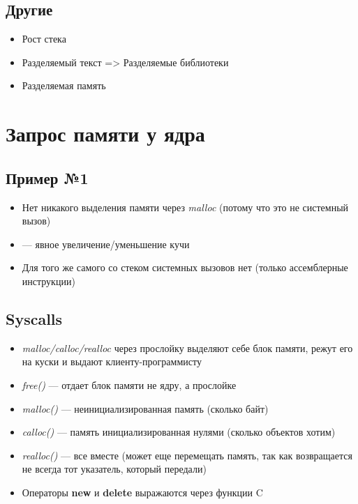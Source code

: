 \documentclass[../../lectures.tex]{subfiles}
\begin{document}
\subsection{Другие}
\begin{itemize}
    \item Рост стека
    \item Разделяемый текст => Разделяемые библиотеки
    \item Разделяемая память
\end{itemize}

\section{Запрос памяти у ядра}
\subsection{Пример №1}


\begin{itemize}
    \item Нет никакого выделения памяти через \emph{malloc} (потому что это не системный вызов)
    \item {} --- явное увеличение/уменьшение кучи
    \item Для того же самого со стеком системных вызовов нет (только ассемблерные инструкции)
\end{itemize}

\subsection{Syscalls}
\begin{itemize}
    \item \emph{malloc/calloc/realloc} через прослойку выделяют себе блок памяти, режут его на куски и выдают клиенту-программисту
    \item \emph{free()} --- отдает блок памяти не ядру, а прослойке
    \item \emph{malloc()} --- неинициализированная память (сколько байт)
    \item \emph{calloc()} --- память инициализированная нулями (сколько объектов хотим)
    \item \emph{realloc()} --- все вместе (может еще перемещать память, 
          так как возвращается не всегда тот указатель, который передали)
    \item Операторы \textbf{new} и \textbf{delete} выражаются через функции C
\end{itemize}
\end{document}
